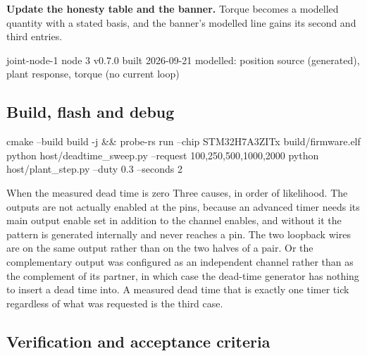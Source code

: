 \begin{steps}
\item \textbf{Update the honesty table and the banner.} Torque becomes a
modelled quantity with a stated basis, and the banner's modelled line gains its
second and third entries.
\begin{shellcode}
joint-node-1  node 3  v0.7.0  built 2026-09-21
modelled: position source (generated), plant response, torque (no current loop)
\end{shellcode}
\end{steps}

\subsection*{Build, flash and debug}


\begin{shellcode}
cmake --build build -j && probe-rs run --chip STM32H7A3ZITx build/firmware.elf
python host/deadtime_sweep.py --request 100,250,500,1000,2000
python host/plant_step.py --duty 0.3 --seconds 2
\end{shellcode}

\begin{note}{When the measured dead time is zero}
Three causes, in order of likelihood. The outputs are not actually enabled at
the pins, because an advanced timer needs its main output enable set in addition
to the channel enables, and without it the pattern is generated internally and
never reaches a pin. The two loopback wires are on the same output rather than
on the two halves of a pair. Or the complementary output was configured as an
independent channel rather than as the complement of its partner, in which case
the dead-time generator has nothing to insert a dead time into. A measured dead
time that is exactly one timer tick regardless of what was requested is the
third case.
\end{note}

\subsection*{Verification and acceptance criteria}


